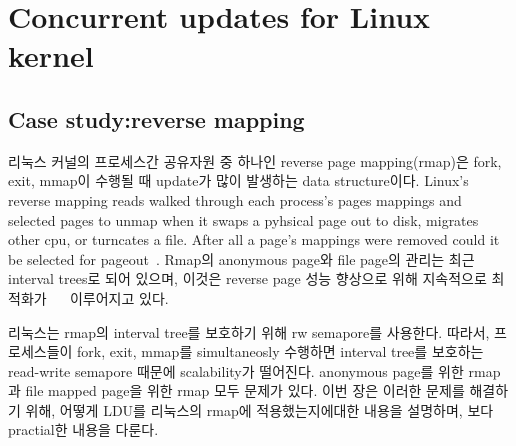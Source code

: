 \section{Concurrent updates for Linux kernel}

\subsection{Case study:reverse mapping}


\ifkor
리눅스 커널의 프로세스간 공유자원 중 하나인 reverse page mapping(rmap)은 fork, exit, mmap이 수행될 때
update가 많이 발생하는 data structure이다.
Linux's reverse mapping reads walked through each process’s pages mappings and
selected pages to unmap when it swaps a pyhsical page out to disk, migrates
other cpu, or turncates a file.
After all a page’s mappings were removed could it be selected for
pageout~\cite{OBJMAPOLS}.
Rmap의 anonymous page와 file page의 관리는 최근 interval trees로 되어 있으며, 이것은 reverse page
성능 향상으로 위해 지속적으로 최적화가 ~\cite{CorbetLWNRMAP}~\cite{CorbetLWNANON} 이루어지고 있다. 
\else


\fi

\ifkor
리눅스는 rmap의 interval tree를 보호하기 위해 rw semapore를 사용한다. 
따라서, 프로세스들이 fork, exit, mmap를 simultaneosly 수행하면 interval tree를 보호하는
read-write semapore 때문에 scalability가 떨어진다.
anonymous page를 위한 rmap과 file mapped page을 위한 rmap 모두 문제가 있다.
이번 장은 이러한 문제를 해결하기 위해, 어떻게 LDU를 리눅스의 rmap에 적용했는지에대한 내용을 설명하며, 보다 practial한 내용을
다룬다.
\else


\fi


